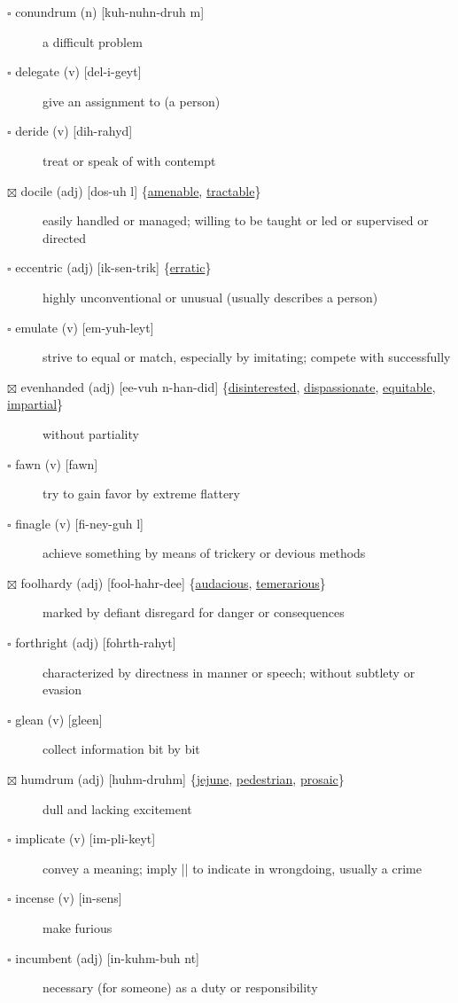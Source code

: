 \documentclass[11pt]{article}
\begin{document}
\begin{description}
\item[{$\square$ conundrum (n) [kuh-nuhn-druh m]}] a difficult problem
\item[{$\square$ delegate (v) [del-i-geyt]}] give an assignment to (a person)
\item[{$\square$ deride (v) [dih-rahyd]}] treat or speak of with contempt
\item[{$\boxtimes$ \label{orgee81bd2}docile (adj) [dos-uh l] \{\hyperref[orgfe6eaea]{amenable}, \hyperref[org8bff33c]{tractable}\}}] easily handled or managed; willing to be taught or led or supervised or directed
\item[{$\square$ \label{orga4742b8} \label{org21ab98d}eccentric (adj) [ik-sen-trik] \{\hyperref[orgdb07f06]{erratic}\}}] highly unconventional or unusual (usually describes a person)
\item[{$\square$ emulate (v) [em-yuh-leyt]}] strive to equal or match, especially by imitating; compete with successfully
\item[{$\boxtimes$ \label{org142d9b2}evenhanded (adj) [ee-vuh n-han-did] \{\hyperref[org12598d9]{disinterested}, \hyperref[org49e3d5e]{dispassionate}, \hyperref[org7398f3e]{equitable}, \hyperref[orgce681fa]{impartial}\}}] without partiality
\item[{$\square$ \label{orgaf85d33} \label{orgd171442} fawn (v) [fawn]}] try to gain favor by extreme flattery
\item[{$\square$ finagle (v) [fi-ney-guh l]}] achieve something by means of trickery or devious methods
\item[{$\boxtimes$ \label{org6f4610e}foolhardy (adj) [fool-hahr-dee] \{\hyperref[org075f98a]{audacious}, \hyperref[orgd7c2d20]{temerarious}\}}] marked by defiant disregard for danger or consequences
\item[{$\square$ forthright (adj) [fohrth-rahyt]}] characterized by directness in manner or speech; without subtlety or evasion
\item[{$\square$ glean (v) [gleen]}] collect information bit by bit
\item[{$\boxtimes$ \label{org896fd35}humdrum (adj) [huhm-druhm] \{\hyperref[org2d80182]{jejune}, \hyperref[org78dd6a1]{pedestrian}, \hyperref[orgb8ddd33]{prosaic}\}}] dull and lacking excitement
\item[{$\square$ implicate (v) [im-pli-keyt] }] convey a meaning; imply || to indicate in wrongdoing, usually a crime
\item[{$\square$ incense (v) [in-sens]}] make furious
\item[{$\square$ incumbent (adj) [in-kuhm-buh nt]}] necessary (for someone) as a duty or responsibility

\end{description}
\end{document}
